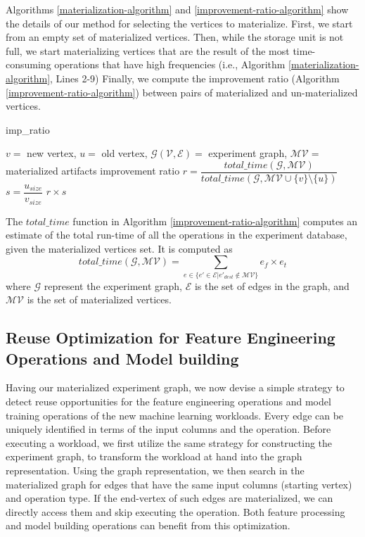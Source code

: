 Algorithms \ref{materialization-algorithm} and \ref{improvement-ratio-algorithm} show the details of our method for selecting the vertices to materialize.
First, we start from an empty set of materialized vertices.
Then, while the storage unit is not full, we start materializing vertices that are the result of the most time-consuming operations that have high frequencies (i.e., Algorithm \ref{materialization-algorithm}, Lines 2-9)
Finally, we compute the improvement ratio (Algorithm \ref{improvement-ratio-algorithm}) between pairs of materialized and un-materialized vertices.

\begin{algorithm}
\caption{imp\_ratio}\label{improvement-ratio-algorithm}
\begin{algorithmic}[1]
\Require  $v=$ new vertex, $u=$ old vertex, $\mathcal{G(V,E)}=$ experiment graph, $\mathcal{MV}=$ materialized artifacts
\Ensure  improvement ratio
\State $r = \dfrac{total\_time(\mathcal{G}, \mathcal{MV})}{total\_time(\mathcal{G}, \mathcal{MV} \cup \{v\} \setminus \{u\})}$
\State $s= \dfrac{u_{size}}{v_{size}}$
\State \Return $r \times s$
\end{algorithmic}
\end{algorithm}

The $total\_time$ function in Algorithm \ref{improvement-ratio-algorithm} computes an estimate of the total run-time of all the operations in the experiment database, given the materialized vertices set.
It is computed as
\[
total\_time(\mathcal{G}, \mathcal{MV}) = \sum\limits_{e \in \{e' \in \mathcal{E} \lvert e'_{dest} \notin \mathcal{MV}\}} e_f \times e_t
\]
where $\mathcal{G}$ represent the experiment graph, $\mathcal{E}$ is the set of edges in the graph, and $\mathcal{MV}$ is the set of materialized vertices.

\subsection{Reuse Optimization for Feature Engineering Operations and Model building}
Having our materialized experiment graph, we now devise a simple strategy to detect reuse opportunities for the feature engineering operations and model training operations of the new machine learning workloads.
Every edge can be uniquely identified in terms of the input columns and the operation.
Before executing a workload, we first utilize the same strategy for constructing the experiment graph, to transform the workload at hand into the graph representation.
Using the graph representation, we then search in the materialized graph for edges that have the same input columns (starting vertex) and operation type.
If the end-vertex of such edges are materialized, we can directly access them and skip executing the operation.
Both feature processing and model building operations can benefit from this optimization.

